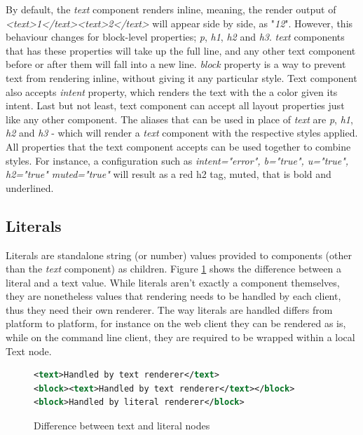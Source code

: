 By default, the \textit{text} component renders inline, meaning, the render output of \textit{<text>1</text><text>2</text>} will appear side by side, as "\textit{12}". However, this behaviour changes for block-level properties; \textit{p}, \textit{h1}, \textit{h2} and \textit{h3}. \textit{text} components that has these properties will take up the full line, and any other text component before or after them will fall into a new line. \textit{block} property is a way to prevent text from rendering inline, without giving it any particular style. Text component also accepts \textit{intent} property, which renders the text with the a color given its intent. Last but not least, text component can accept all layout properties just like any other component. The aliases that can be used in place of \textit{text} are \textit{p}, \textit{h1}, \textit{h2} and \textit{h3} - which will render a \textit{text} component with the respective styles applied. All properties that the text component accepts can be used together to combine styles. For instance, a configuration such as \textit{intent="error", b="true", u="true", h2="true" muted="true"} will result as a red h2 tag, muted, that is bold and underlined.

\subsection{Literals}

Literals are standalone string (or number) values provided to components (other than the \textit{text} component) as children. Figure \ref{fig:text_vs_literal} shows the difference between a literal and a text value. While literals aren't exactly a component themselves, they are nonetheless values that rendering needs to be handled by each client, thus they need their own renderer. The way literals are handled differs from platform to platform, for instance on the web client they can be rendered as is, while on the command line client, they are required to be wrapped within a local Text node.

\begin{figure}
\begin{minipage}{\linewidth}
\begin{lstlisting}[language=xml]
<text>Handled by text renderer</text>
<block><text>Handled by text renderer</text></block>
<block>Handled by literal renderer</block>
\end{lstlisting}
\end{minipage}
\caption{Difference between text and literal nodes}%
\label{fig:text_vs_literal}%
\end{figure}


